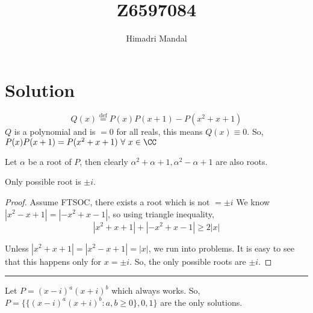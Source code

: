 \documentclass[11pt]{scrartcl}
\title{Z6597084}
\author{Himadri Mandal}
\begin{document}
\maketitle

\section{Solution}
\begin{soln}
  \raggedright
  \[ Q(x) \stackrel{\text{def}}= P(x)P(x+1) - P(x^2 + x + 1) \] 
  $Q$ is a polynomial and is $= 0$ for all reals, this means $Q(x) \equiv 0$. 
  So, $P(x)P(x+1) = P(x^2 + x + 1) \ \forall \ x \in \CC$

  Let $\alpha$ be a root of $P$, then clearly $\alpha^2 + \alpha + 1, \alpha^2 - \alpha + 1$ are also roots.
  \begin{claim*}
    Only possible root is $\pm i$. 
  \end{claim*}
  \begin{proof}
    Assume FTSOC, there exists a root which is not $= \pm i$
    We know $|x^2 -x + 1| = |-x^2 +x -1|$, so using triangle inequality, 
    \[ |x^2 + x + 1| + |-x^2 + x -1| \geq 2|x| \]

    Unless $|x^2 + x + 1| = |x^2 - x + 1| = |x|$, we run into problems. It is easy to see that this happens
    only for $x = \pm i$. So, the only possible roots are $\pm i$.
  \end{proof}
  \hrule

  \bigskip
  Let $P = (x-i)^{a}(x+i)^{b}$ which always works. So, $\boxed{P = \{\{(x-i)^a(x+i)^b : a,b \geq 0\}, 0, 1\}}$ are the only solutions.
  
\end{soln}
\end{document}
